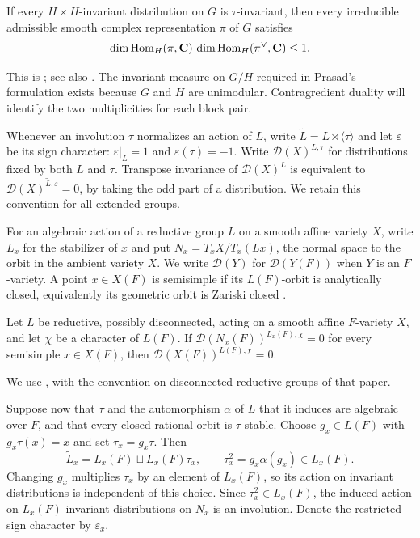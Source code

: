 \begin{proposition}\label{m1:prop:GK}\label{m2:tools:gk}
If every $H\times H$-invariant distribution on $G$ is $\tau$-invariant,
then every irreducible admissible smooth complex representation $\pi$ of
$G$ satisfies
\[
 \dim\operatorname{Hom}_H(\pi,\mathbf C)\,\dim\operatorname{Hom}_H(\pi^\vee,\mathbf C)\leq1.
\]
\end{proposition}
This is \cite[Lemma~4.2]{Prasad90}; see also
\cite[Remark~2.4.6]{AGSGelfand}. The invariant measure on $G/H$ required in
Prasad's formulation exists because $G$ and $H$ are unimodular.
Contragredient duality will identify the two multiplicities for each block pair.

Whenever an involution $\tau$ normalizes an action of $L$, write
$\widetilde L=L\rtimes\langle\tau\rangle$ and let $\varepsilon$ be its
sign character: $\varepsilon|_L=1$ and $\varepsilon(\tau)=-1$.
Write $\mathcal D(X)^{L,\tau}$ for distributions fixed by both $L$ and $\tau$.
Transpose invariance of $\mathcal D(X)^L$ is equivalent to
$\mathcal D(X)^{\widetilde L,\varepsilon}=0$, by taking the odd part of a
distribution. We retain this convention for all extended groups.

For an algebraic action of a reductive group $L$ on a smooth affine
variety $X$, write $L_x$ for the stabilizer of $x$ and put
$N_x=T_xX/T_x(Lx)$, the normal space to the orbit in the ambient variety $X$.
We write $\mathcal D(Y)$ for $\mathcal D(Y(F))$ when $Y$ is an $F$-variety.
A point $x\in X(F)$ is semisimple if its $L(F)$-orbit
is analytically closed, equivalently its geometric orbit is Zariski
closed \cite[Theorem~2.3.8]{AGDescent}.

\begin{theorem}
\label{m1:thm:HC-descent}\label{m2:tools:descent}\label{m1:subsec:HC-descent}
Let $L$ be reductive, possibly disconnected, acting on a smooth affine
$F$-variety $X$, and let $\chi$ be a character of $L(F)$. If
$\mathcal D(N_x(F))^{L_x(F),\chi}=0$ for every semisimple $x\in X(F)$,
then $\mathcal D(X(F))^{L(F),\chi}=0$.
\end{theorem}
We use \cite[Theorem~3.1.1]{AGDescent}, with the convention on disconnected
reductive groups of that paper.

Suppose now that $\tau$ and the automorphism $\alpha$ of $L$ that it
induces are algebraic over $F$, and that every closed rational orbit is
$\tau$-stable. Choose $g_x\in L(F)$ with $g_x\tau(x)=x$ and set
$\tau_x=g_x\tau$. Then
\begin{equation}\label{m1:eq:corrected-extension}
 \widetilde L_x=L_x(F)\sqcup L_x(F)\tau_x,
 \qquad \tau_x^2=g_x\alpha(g_x)\in L_x(F).
\end{equation}
Changing $g_x$ multiplies $\tau_x$ by an element of $L_x(F)$,
so its action on invariant distributions is independent of this choice.
Since $\tau_x^2\in L_x(F)$, the induced action on
$L_x(F)$-invariant distributions on $N_x$ is an involution. Denote the
restricted sign character by $\varepsilon_x$.

